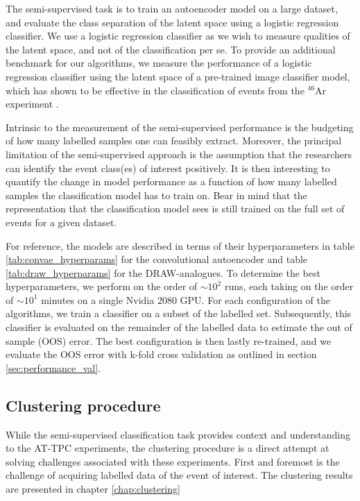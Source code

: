 The semi-supervised task is to train an autoencoder model on a large dataset, and evaluate the class separation of the latent space using a logistic regression classifier. We use a logistic regression classifier as we wish to measure qualities of the latent space, and not of the classification per se. To provide an additional benchmark for our algorithms, we measure the performance of a logistic regression classifier using the latent space of a pre-trained image classifier model, which has shown to be effective in the classification of events from the ${}^{46}$Ar experiment \cite{Kuchera2019}.

Intrinsic to the measurement of the semi-supervised performance is the budgeting of how many labelled samples one can feasibly extract. Moreover, the principal limitation of the semi-supervised approach is the assumption that the researchers can identify the event class(es) of interest positively. It is then interesting to quantify the change in model performance as a function of how many labelled samples the classification model has to train on. Bear in mind that the representation that the classification model sees is still trained on the full set of events for a given dataset. 

For reference, the models are described in terms of their hyperparameters in table \ref{tab:convae_hyperparams} for the convolutional autoencoder and table \ref{tab:draw_hyperparams} for the DRAW-analogues. To determine the best hyperparameters, we perform on the order of $\sim 10^2$ runs, each taking on the order of $\sim 10^1$ minutes on a single Nvidia $2080$ GPU. For each configuration of the algorithms, we train a classifier on a subset of the labelled set. Subsequently, this classifier is evaluated on the remainder of the labelled data to estimate the out of sample (OOS) error. The best configuration is then lastly re-trained, and we evaluate the OOS error with k-fold cross validation as outlined in section \ref{sec:performance_val}.

\subsection{Clustering procedure}\label{sec:cster_procedure}

While the semi-supervised classification task provides context and understanding to the AT-TPC experiments, the clustering procedure is a direct attempt at solving challenges associated with these experiments. First and foremost is the challenge of acquiring labelled data of the event of interest. The clustering results are presented in chapter \ref{chap:clustering} 

